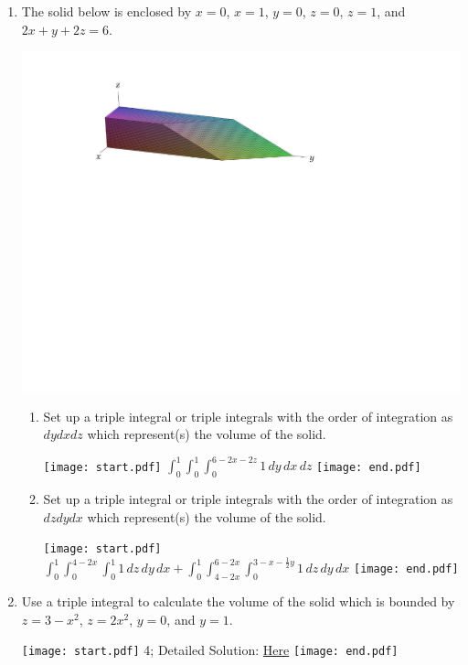 \documentclass[12pt]{article}
\begin{document}
\begin{enumerate}
\item The solid below is enclosed by $x=0$, $x=1$, $y=0$, $z=0$, $z=1$, and $2x+y+2z=6$.

\begin{center}
\includegraphics[scale=0.7]{volume.pdf}
\end{center}

\begin{enumerate}

\item Set up a triple integral or triple integrals with the order of integration as \underline{$dydxdz$} which represent(s) the volume of the solid.

\texttt{[image: start.pdf]}
{{$\int_0^1 \int_0^1 \int_0^{6-2x-2z} 1 \,dy\,dx\,dz$}}
\texttt{[image: end.pdf]}


\item Set up a triple integral or triple integrals with the order of integration as \underline{$dzdydx$} which represent(s) the volume of the solid.

\texttt{[image: start.pdf]}
{{$\int_0^1 \int_0^{4-2x} \int_0^{1} 1 \,dz\,dy\,dx+\int_0^1 \int_{4-2x}^{6-2x} \int_0^{3-x-\frac{1}{2}y} 1 \,dz\,dy\,dx$}}
\texttt{[image: end.pdf]}


\end{enumerate}

\item Use a triple integral to calculate the volume of the solid which is bounded by $z=3-x^2$, $z=2x^2$, $y=0$, and $y=1$.

\texttt{[image: start.pdf]}
{{4; Detailed Solution: \textcolor{blue}{\href{http://www.math.drexel.edu/classes/Calculus/resources/Math200HW/Solutions/20_200_Triple_Integrals_05.pdf}{Here}}}}
\texttt{[image: end.pdf]}



\end{enumerate}
\end{document}
